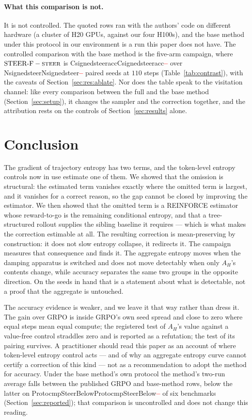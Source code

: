 \documentclass[11pt]{article}
\newcommand{\AH}{A_{H}}
\providecommand{\PENDING}{\textcolor{red}{\textbf{--}}}
\newcommand{\num}[1]{\ifcsname #1\endcsname\csname #1\endcsname\else\PENDING\fi}
\begin{document}
\paragraph{What this comparison is not.} It is not controlled. The quoted rows ran
with the authors' code on different hardware (a cluster of H20 GPUs, against our four
H100s), and the base method under this protocol in our environment is a run this
paper does not have. The controlled comparison with the base method is the five-arm
campaign, where $\text{STEER-F} - \textsc{steer}$ is \num{Csignedsteeracc} over
\num{Nsignedsteer} paired seeds at $110$ steps (Table~\ref{tab:contrast}), with the
caveats of Section~\ref{sec:res:ablate}. Nor does the table speak to the visitation
channel: like every comparison between the full and the base method
(Section~\ref{sec:setup}), it changes the sampler and the correction together, and
the attribution rests on the controls of Section~\ref{sec:results} alone.

\section{Conclusion}

The gradient of trajectory entropy has two terms, and the token-level entropy
controls now in use estimate one of them. We showed that the omission is structural:
the estimated term vanishes exactly where the omitted term is largest, and it
vanishes for a correct reason, so the gap cannot be closed by improving the
estimator. We then showed that the omitted term is a REINFORCE estimator whose
reward-to-go is the remaining conditional entropy, and that a tree-structured
rollout supplies the sibling baseline it requires --- which is what makes the
correction estimable at all. The resulting correction is mean-preserving by
construction: it does not slow entropy collapse, it redirects it. The campaign
measures that consequence and finds it. The aggregate entropy moves when the damping
apparatus is switched and does not move detectably when only $\AH$'s contents change,
while accuracy separates the same two groups in the opposite direction. On the seeds
in hand that is a statement about what is detectable, not a proof that the aggregate
is untouched.

The accuracy evidence is weaker, and we leave it that way rather than dress it. The
gain over GRPO is inside GRPO's own seed spread and close to zero where equal steps
mean equal compute; the registered test of $\AH$'s value against a value-free
control straddles zero and is reported as a refutation; the test of its pairing
survives. A practitioner should read this paper as an account of where token-level
entropy control acts --- and of why an aggregate entropy curve cannot certify a
correction of this kind --- not as a recommendation to adopt the method for accuracy.
Under the base method's own protocol the method's two-run average falls between the
published GRPO and base-method rows, below the latter on \num{ProtocmpSteerBelow} of
six benchmarks (Section~\ref{sec:reported}); that comparison is uncontrolled and does
not change this reading.
\end{document}
